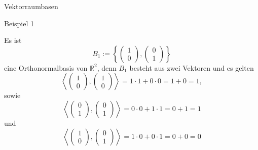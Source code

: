 \documentclass[
  8pt,
  ignorenonframetext,
]{beamer}
\begin{document}
\begin{frame}{Vektorraumbasen}
\protect\hypertarget{vektorraumbasen-5}{}
\small

Beispiel 1 

\footnotesize

Es ist \begin{equation}
B_1 :=
\left\lbrace
\begin{pmatrix}
1 \\ 0
\end{pmatrix},
\begin{pmatrix}
0 \\ 1
\end{pmatrix}
\right\rbrace
\end{equation} eine Orthonormalbasis von \(\mathbb{R}^2\), denn \(B_1\)
besteht aus zwei Vektoren und es gelten \begin{equation}
\left \langle
\begin{pmatrix}
1 \\ 0
\end{pmatrix},
\begin{pmatrix}
1 \\ 0
\end{pmatrix}
\right \rangle
= 1 \cdot 1
+ 0 \cdot 0
= 1 + 0
= 1,
\end{equation} sowie \begin{equation}
\left \langle
\begin{pmatrix}
0 \\ 1
\end{pmatrix},
\begin{pmatrix}
0 \\1
\end{pmatrix}
\right \rangle
= 0 \cdot 0
+ 1 \cdot 1
= 0 + 1
= 1
\end{equation} und \begin{equation}
\left \langle
\begin{pmatrix}
1 \\ 0
\end{pmatrix},
\begin{pmatrix}
0 \\ 1
\end{pmatrix}
\right \rangle
=    1 \cdot 0
  +  0  \cdot 1
= 0 + 0
= 0
\end{equation}
\end{frame}
\end{document}
